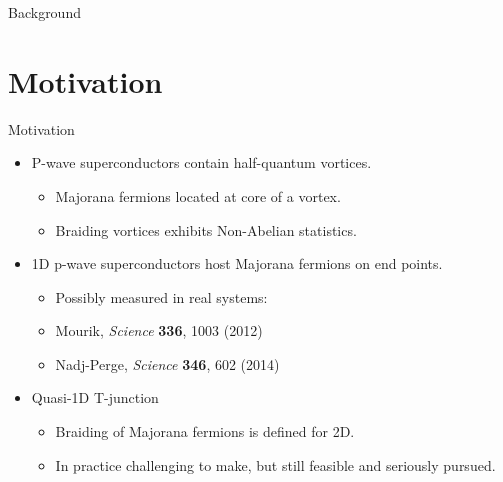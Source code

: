 \documentclass[xcolor=dvipsnames,10pt,aspectratio=169]{beamer}
\newcommand{\BD}{Background}
\newcommand{\MO}{Motivation}
\begin{document}
  \begin{frame}{\BD}
    \begin{multicols}{2}

    \end{multicols}

  \end{frame}

  \section{\MO}
  \begin{frame}{\MO}{}

    \begin{multicols}{2}

    \begin{itemize}
      \item P-wave superconductors contain half-quantum vortices.
        \begin{itemize}
          \item Majorana fermions located at core of a vortex.
          \item Braiding vortices exhibits Non-Abelian statistics.
        \end{itemize}
      \item 1D p-wave superconductors host Majorana fermions on end points.
        \begin{itemize}
          \item Possibly measured in real systems:
          \item[] \hspace{0.40em}\scriptsize Mourik, \textit{Science} \textbf{336}, 1003 (2012)
          \item[] \hspace{0.50em}\scriptsize Nadj-Perge, \textit{Science} \textbf{346}, 602 (2014)
        \end{itemize}
      \item Quasi-1D T-junction
        \begin{itemize}
          \item Braiding of Majorana fermions is defined for 2D.
          \item In practice challenging to make, but still feasible and seriously pursued.
        \end{itemize}
    \end{itemize}

    \begin{figure}
      \end{figure}
    \end{multicols}

  \end{frame}
\end{document}
